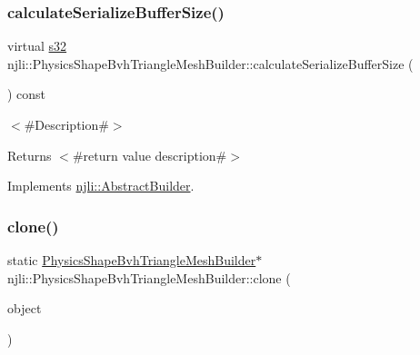 \mbox{\label{classnjli_1_1_physics_shape_bvh_triangle_mesh_builder_af797e698d40eb6aef835f8d346a3e52c}} 
\subsubsection{\texorpdfstring{calculate\+Serialize\+Buffer\+Size()}{calculateSerializeBufferSize()}}
{\footnotesize\ttfamily virtual \mbox{\hyperlink{_util_8h_aa62c75d314a0d1f37f79c4b73b2292e2}{s32}} njli\+::\+Physics\+Shape\+Bvh\+Triangle\+Mesh\+Builder\+::calculate\+Serialize\+Buffer\+Size (\begin{DoxyParamCaption}{ }\end{DoxyParamCaption}) const\hspace{0.3cm}{\ttfamily [virtual]}}

$<$\#\+Description\#$>$

\begin{DoxyReturn}{Returns}
$<$\#return value description\#$>$ 
\end{DoxyReturn}


Implements \mbox{\hyperlink{classnjli_1_1_abstract_builder_aa1d220053e182c37b31b427499c6eacf}{njli\+::\+Abstract\+Builder}}.

\mbox{\label{classnjli_1_1_physics_shape_bvh_triangle_mesh_builder_a2228084f7bb0e23ecf92b03b643c7b9c}} 
\subsubsection{\texorpdfstring{clone()}{clone()}}
{\footnotesize\ttfamily static \mbox{\hyperlink{classnjli_1_1_physics_shape_bvh_triangle_mesh_builder}{Physics\+Shape\+Bvh\+Triangle\+Mesh\+Builder}}$\ast$ njli\+::\+Physics\+Shape\+Bvh\+Triangle\+Mesh\+Builder\+::clone (\begin{DoxyParamCaption}\item[{const \mbox{\hyperlink{classnjli_1_1_physics_shape_bvh_triangle_mesh_builder}{Physics\+Shape\+Bvh\+Triangle\+Mesh\+Builder}} \&}]{object }\end{DoxyParamCaption})\hspace{0.3cm}{\ttfamily [static]}}

